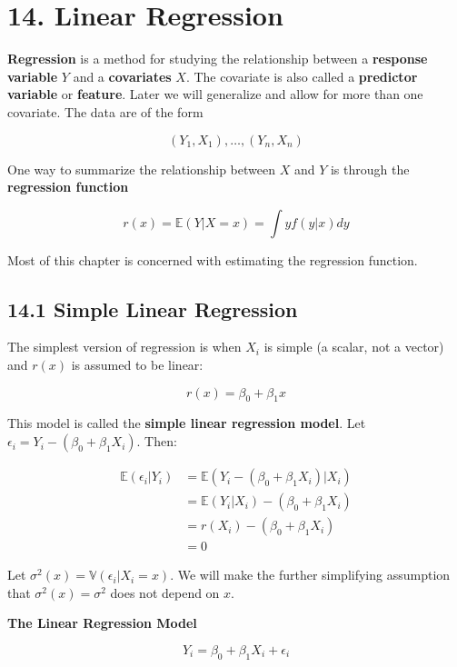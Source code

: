 \section*{14. Linear Regression}\label{linear-regression}

\textbf{Regression} is a method for studying the relationship between a
\textbf{response variable} \(Y\) and a \textbf{covariates} \(X\). The
covariate is also called a \textbf{predictor variable} or
\textbf{feature}. Later we will generalize and allow for more than one
covariate. The data are of the form

\[ (Y_{1}, X_{1}), \dots, (Y_{n}, X_{n}) \]

One way to summarize the relationship between \(X\) and \(Y\) is through
the \textbf{regression function}

\[ r(x) = \mathbb{E}(Y | X = x) = \int y f(y | x) dy \]

Most of this chapter is concerned with estimating the regression
function.

\subsection*{14.1 Simple Linear
Regression}\label{simple-linear-regression}

The simplest version of regression is when \(X_{i}\) is simple (a scalar,
not a vector) and \(r(x)\) is assumed to be linear:

\[r(x) = \beta_{0} + \beta_{1} x\]

This model is called the \textbf{simple linear regression model}. Let
\(\epsilon_{i} = Y_{i} - (\beta_{0} + \beta_{1} X_{i})\). Then:

\begin{align*}
\mathbb{E}(\epsilon_{i} | Y_{i}) &= \mathbb{E}(Y_{i} - (\beta_{0} + \beta_{1} X_{i}) | X_{i})\\
&= \mathbb{E}(Y_{i} | X_{i}) - (\beta_{0} + \beta_{1} X_{i})\\
&= r(X_{i}) - (\beta_{0} + \beta_{1} X_{i})\\
&= 0
\end{align*}

Let \(\sigma^{2}(x) = \mathbb{V}(\epsilon_{i} | X_{i} = x)\). We will make the
further simplifying assumption that \(\sigma^{2}(x) = \sigma^{2}\) does not
depend on \(x\).

\textbf{The Linear Regression Model}

\[Y_{i} = \beta_{0} + \beta_{1} X_{i} + \epsilon_{i}\]

